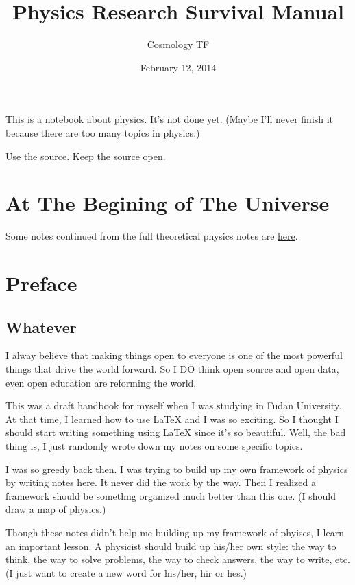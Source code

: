 \documentclass[letterpaper,10pt,english]{sphinxmanual}
\title{Physics Research Survival Manual}
\date{February 12, 2014}
\author{Cosmology TF}
\begin{document}
\maketitle
\tableofcontents
{}\label{index::doc}


This is a notebook about physics. It's not done yet. (Maybe I'll never finish it because there are too many topics in physics.)

Use the source. Keep the source open.


\chapter{At The Begining of The Universe}
\label{index:at-the-begining-of-the-universe}\label{index:welcome-to-physics-research-survival-manual}
Some notes continued from the full theoretical physics notes are \href{http://cosmologytaskforce.github.io/PhysicsResearchSurvivalManual/}{here}.


\chapter{Preface}
\label{index:preface}

\section{Whatever}
\label{preface::doc}\label{preface:whatever}
I alway believe that making things open to everyone is one of the most powerful things that drive the world forward. So I DO think open source and open data, even open education are reforming the world.

This was a draft handbook for myself when I was studying in Fudan University. At that time, I learned how to use LaTeX and I was so exciting. So I thought I should start writing something using LaTeX since it's so beautiful. Well, the bad thing is, I just randomly wrote down my notes on some specific topics.

I was so greedy back then. I was trying to build up my own framework of physics by writing notes here. It never did the work by the way. Then I realized a framework should be somethng organized much better than this one. (I should draw a map of physics.)

Though these notes didn't help me building up my framework of phyiscs, I learn an important lesson. A physicist should build up his/her own style: the way to think, the way to solve problems, the way to check answers, the way to write, etc.  (I just want to create a new word for his/her, hir or hes.)
\end{document}
